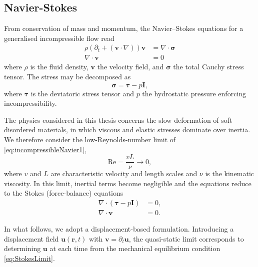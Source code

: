 \documentclass[asymmetricmargins]{library/duthesis}%
\providecommand{\DIFadd}[1]{{\protect\color{blue}\uwave{#1}}} %
\providecommand{\DIFaddbegin}{} %
\providecommand{\DIFaddend}{} %
\begin{document}
\subsection{\DIFaddbegin \DIFadd{The }\DIFaddend Navier-Stokes \DIFaddbegin \DIFadd{Equations}\DIFaddend }
From conservation of mass and momentum, the Navier--Stokes equations for a generalised incompressible flow read
\begin{subequations}
\label{eq:NavierStokes}
\begin{align}
    \rho \left(\partial_t+(\bm{v} \cdot \nabla)\right)\bm{v} &= \nabla \cdot \bm{\sigma} \label{eq:incompressibleNavier1} \\
    \nabla\cdot\bm{v} &= 0 \label{eq:incompressibleNavier2}
\end{align}
\end{subequations}
where $\rho$ is the fluid density, $\bm{v}$ the velocity field, and $\bm{\sigma}$ the total Cauchy stress tensor. The stress may be decomposed as
\begin{equation*}
    \bm{\sigma} = \bm{\tau} - p\bm{I},
\end{equation*}
where $\bm{\tau}$ is the deviatoric stress tensor and $p$ the hydrostatic pressure enforcing incompressibility.

The physics considered in this thesis concerns the slow deformation of soft disordered materials, in which viscous and elastic stresses dominate over inertia. We therefore consider the low-Reynolds-number limit of \cref{eq:incompressibleNavier1},
\[
    \text{Re} = \frac{v L}{\nu} \to 0,
\]
where $v$ and $L$ are characteristic velocity and length scales and $\nu$ is the kinematic viscosity. In this limit, inertial terms become negligible and the equations reduce to the Stokes (force-balance) equations
\begin{subequations}
\label{eq:StokesLimit}
\begin{align}
    \nabla \cdot (\bm{\tau} - p\bm{I}) &= 0, \\
    \nabla \cdot \bm{v} &= 0.
\end{align}
\end{subequations}

In what follows, we adopt a displacement-based formulation. Introducing a displacement field $\bm{u}(\bm{r},t)$ with $\bm{v}=\partial_t\bm{u}$, the quasi-static limit corresponds to determining $\bm{u}$ at each time from the mechanical equilibrium condition \cref{eq:StokesLimit}.
\end{document}
